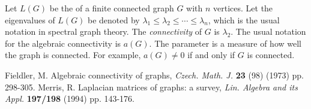 \documentclass[12pt]{article}
\begin{document}
Let $L(G)$ be the 
 of a finite connected graph $G$ with $n$ vertices. Let the eigenvalues
of $L(G)$ be denoted by
$\lambda_1 \le \lambda_2 \le \cdots \le \lambda_n$, which
is the usual notation in spectral graph theory.
The \emph{ connectivity} of $G$ is $\lambda_2$.
The usual notation for the algebraic connectivity is $a(G)$.
The parameter is a measure of how well the graph is connected.
For example, $a(G) \not = 0$ if and only if $G$ is connected.


\begin{thebibliography}{99}
 Fieldler, M. Algebraic connectivity of graphs, \emph{Czech. Math. J.} \textbf{23} (98) (1973) 
pp. 298-305.
 Merris, R. Laplacian matrices of graphs: a survey, 
\emph{Lin. Algebra and its Appl.} \textbf{197/198} (1994) pp. 143-176.
\end{thebibliography}


\end{document}
